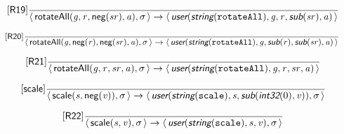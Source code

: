 \documentclass[10pt,leqno]{article}
\newcommand{\artVariable}[1]{\mbox{\em #1\/}}
\newcommand{\artConstructor}[1]{\mbox{\sf #1}}
\newcommand{\artCaseInsensitiveLiteral}[1]{\mbox{\tt #1}}
\newcommand{\artSpecial}[1]{\mbox{\sf\em #1}}
\begin{document}
\begin{equation}
\tag*{[\artConstructor{\sf R19}]}\frac{}{\langle\, \artConstructor{\sf rotateAll}(\artVariable{g}, \artVariable{r}, \artConstructor{\sf neg}(\artVariable{sr}), \artVariable{a}), \artVariable{$\sigma$}\,\rangle \rightarrow \langle\, \artSpecial{user}(\artSpecial{string}(\artCaseInsensitiveLiteral{rotateAll}), \artVariable{g}, \artVariable{r}, \artSpecial{sub}(\artVariable{sr}), \artVariable{a})\,\rangle }
\end{equation}

\begin{equation}
\tag*{[\artConstructor{\sf R20}]}\frac{}{\langle\, \artConstructor{\sf rotateAll}(\artVariable{g}, \artConstructor{\sf neg}(\artVariable{r}), \artConstructor{\sf neg}(\artVariable{sr}), \artVariable{a}), \artVariable{$\sigma$}\,\rangle \rightarrow \langle\, \artSpecial{user}(\artSpecial{string}(\artCaseInsensitiveLiteral{rotateAll}), \artVariable{g}, \artSpecial{sub}(\artVariable{r}), \artSpecial{sub}(\artVariable{sr}), \artVariable{a})\,\rangle }
\end{equation}

\begin{equation}
\tag*{[\artConstructor{\sf R21}]}\frac{}{\langle\, \artConstructor{\sf rotateAll}(\artVariable{g}, \artVariable{r}, \artVariable{sr}, \artVariable{a}), \artVariable{$\sigma$}\,\rangle \rightarrow \langle\, \artSpecial{user}(\artSpecial{string}(\artCaseInsensitiveLiteral{rotateAll}), \artVariable{g}, \artVariable{r}, \artVariable{sr}, \artVariable{a})\,\rangle }
\end{equation}

\begin{equation}
\tag*{[\artConstructor{\sf scale}]}\frac{}{\langle\, \artConstructor{\sf scale}(\artVariable{s}, \artConstructor{\sf neg}(\artVariable{v})), \artVariable{$\sigma$}\,\rangle \rightarrow \langle\, \artSpecial{user}(\artSpecial{string}(\artCaseInsensitiveLiteral{scale}), \artVariable{s}, \artSpecial{sub}(\artSpecial{int32}(0), \artVariable{v})), \artVariable{$\sigma$}\,\rangle }
\end{equation}

\begin{equation}
\tag*{[\artConstructor{\sf R22}]}\frac{}{\langle\, \artConstructor{\sf scale}(\artVariable{s}, \artVariable{v}), \artVariable{$\sigma$}\,\rangle \rightarrow \langle\, \artSpecial{user}(\artSpecial{string}(\artCaseInsensitiveLiteral{scale}), \artVariable{s}, \artVariable{v}), \artVariable{$\sigma$}\,\rangle }
\end{equation}
\end{document}
